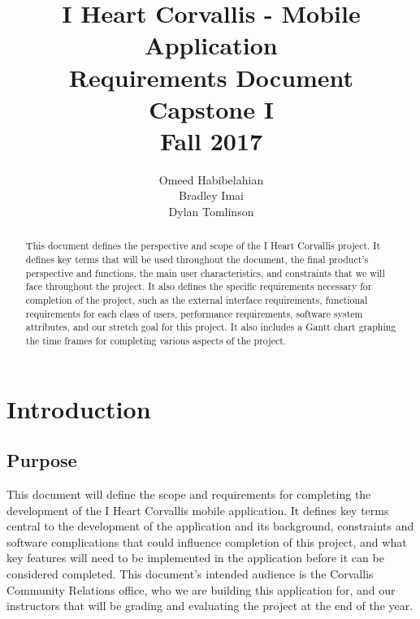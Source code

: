 \documentclass[draftclsnofoot, onecolumn, 10pt, compsoc]{IEEEtran}
\title{\textbf{I Heart Corvallis - Mobile Application\\Requirements Document}\\Capstone I\\Fall 2017}
\author{Omeed Habibelahian\\Bradley Imai\\Dylan Tomlinson}
\begin{document}
	\maketitle
	\begin{abstract}
		This document defines the perspective and scope of the I Heart Corvallis project. It defines key terms that will be used throughout the document, the final product's perspective and functions, the main user characteristics, and constraints that we will face throughout the project. It also defines the specific requirements necessary for completion of the project, such as the external interface requirements, functional requirements for each class of users, performance requirements, software system attributes, and our stretch goal for this project. It also includes a Gantt chart graphing the time frames for completing various aspects of the project.
	\end{abstract}
	\newpage

	\section{Introduction}
		\subsection{Purpose}
			This document will define the scope and requirements for completing the development of the I Heart Corvallis mobile application. It defines key terms central to the development of the application and its background, constraints and software complications that could influence completion of this project, and what key features will need to be implemented in the application before it can be considered completed. This document's intended audience is the Corvallis Community Relations office, who we are building this application for, and our instructors that will be grading and evaluating the project at the end of the year.
\end{document}
